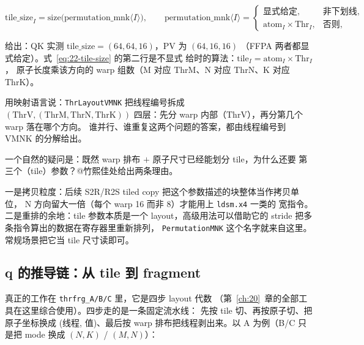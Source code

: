 \begin{equation}
  \mathrm{tile\_size}_I = \mathrm{size}\bigl(\mathrm{permutation\_mnk}\langle I\rangle\bigr),
  \qquad
  \mathrm{permutation\_mnk}\langle I\rangle =
  \begin{cases}
    \text{显式给定}, & \text{非下划线},\\[2pt]
    \mathrm{atom}_I \times \mathrm{Thr}_I, & \text{否则},
  \end{cases}
  \label{eq:22-tile-size}
\end{equation}

给出：QK 实测 $\mathrm{tile\_size} = (64,64,16)$，PV 为 $(64,16,16)$
（FFPA 两者都显式给定）。式~\eqref{eq:22-tile-size} 的第二行是不显式
给时的算法：$\mathrm{tile}_I = \mathrm{atom}_I \times \mathrm{Thr}_I$，
原子长度乘该方向的 warp 组数（M 对应
$\mathrm{ThrM}$、N 对应 $\mathrm{ThrN}$、K 对应 $\mathrm{ThrK}$）。

用映射语言说：\texttt{Thr\allowbreak{}Layout\allowbreak{}VMNK} 把线程编号拆成
$(\mathrm{ThrV},(\mathrm{ThrM},\mathrm{ThrN},\mathrm{ThrK}))$ 四层：先分
warp 内部（$\mathrm{ThrV}$），再分第几个 warp 落在哪个方向。
谁并行、谁重复这两个问题的答案，都由线程编号到 VMNK 的分解给出。

一个自然的疑问是：既然 warp 排布 $+$ 原子尺寸已经能划分 tile，为什么还要
第三个（tile）参数？@竹熙佳处给出两条理由。

一是拷贝粒度：后续 S2R/R2S tiled copy 把这个参数描述的块整体当作拷贝单位，
N 方向留大一倍（每个 warp 16 而非 8）才能用上 \texttt{ldsm.x4} 一类的
宽指令。二是重排的余地：tile 参数本质是一个 layout，高级用法可以借助它的
stride 把多条指令算出的数据在寄存器里重新排列，
\texttt{Permutation\allowbreak{}MNK} 这个名字就来自这里。常规场景把它当 tile 尺寸读即可。

\subsection{q 的推导链：从 tile 到 fragment}

真正的工作在 \texttt{thrfrg\_\allowbreak{}A/\allowbreak{}B/\allowbreak{}C} 里，它是四步 layout 代数
（第~\ref{ch:20}~章的全部工具在这里综合使用）。四步走的是一条固定流水线：
先按 tile 切、再按原子切、把原子坐标换成 (线程, 值)、最后按 warp
排布把线程剥出来。以 A 为例（B/C 只是把 mode 换成 $(N,K)$ / $(M,N)$）：

